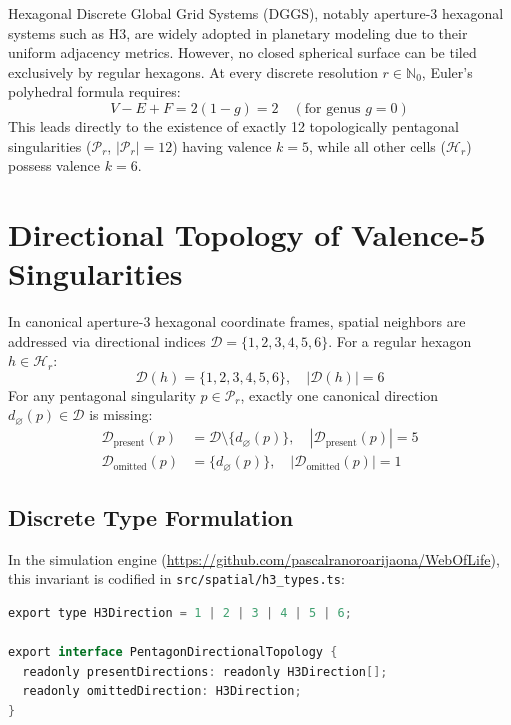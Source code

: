 \documentclass[10pt,journal,compsoc]{IEEEtran}
\begin{document}
Hexagonal Discrete Global Grid Systems (DGGS), notably aperture-3 hexagonal systems such as H3, are widely adopted in planetary modeling due to their uniform adjacency metrics. However, no closed spherical surface can be tiled exclusively by regular hexagons. At every discrete resolution $r \in \mathbb{N}_0$, Euler's polyhedral formula requires:
\begin{equation}
V - E + F = 2(1 - g) = 2 \quad (\text{for genus } g = 0)
\end{equation}
This leads directly to the existence of exactly 12 topologically pentagonal singularities ($\mathcal{P}_r$, $|\mathcal{P}_r| = 12$) having valence $k=5$, while all other cells ($\mathcal{H}_r$) possess valence $k=6$.

\section{Directional Topology of Valence-5 Singularities}

In canonical aperture-3 hexagonal coordinate frames, spatial neighbors are addressed via directional indices $\mathcal{D} = \{1, 2, 3, 4, 5, 6\}$. For a regular hexagon $h \in \mathcal{H}_r$:
\begin{equation}
\mathcal{D}(h) = \{1, 2, 3, 4, 5, 6\}, \quad |\mathcal{D}(h)| = 6
\end{equation}
For any pentagonal singularity $p \in \mathcal{P}_r$, exactly one canonical direction $d_\varnothing(p) \in \mathcal{D}$ is missing:
\begin{align}
\mathcal{D}_{\text{present}}(p) &= \mathcal{D} \setminus \{ d_\varnothing(p) \}, \quad |\mathcal{D}_{\text{present}}(p)| = 5 \\
\mathcal{D}_{\text{omitted}}(p) &= \{ d_\varnothing(p) \}, \quad |\mathcal{D}_{\text{omitted}}(p)| = 1
\end{align}

\subsection{Discrete Type Formulation}
In the simulation engine (\url{https://github.com/pascalranoroarijaona/WebOfLife}), this invariant is codified in \texttt{src/spatial/h3\_types.ts}:

\begin{lstlisting}[language=Java]
export type H3Direction = 1 | 2 | 3 | 4 | 5 | 6;

export interface PentagonDirectionalTopology {
  readonly presentDirections: readonly H3Direction[];
  readonly omittedDirection: H3Direction;
}
\end{lstlisting}
\end{document}
